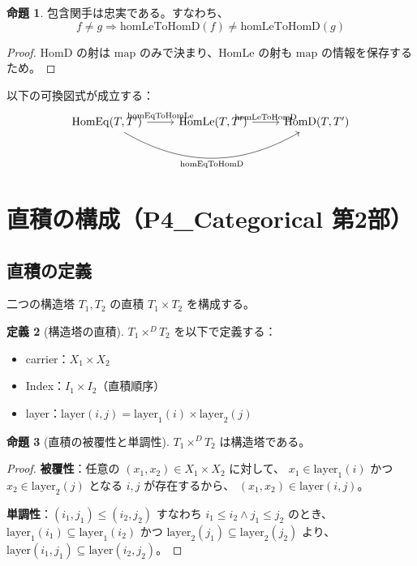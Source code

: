 \documentclass[a4paper,11pt]{ltjsarticle}
\theoremstyle{definition}
\newtheorem{definition}{定義}[section]
\newtheorem{proposition}[definition]{命題}
\begin{document}
\begin{proposition}
包含関手は忠実である。すなわち、
\[
f \neq g \Rightarrow \mathrm{homLeToHomD}(f) \neq \mathrm{homLeToHomD}(g)
\]
\end{proposition}

\begin{proof}
$\mathrm{HomD}$ の射は $\mathrm{map}$ のみで決まり、$\mathrm{HomLe}$ の射も $\mathrm{map}$ の情報を保存するため。
\end{proof}

以下の可換図式が成立する：
\[
\begin{tikzcd}
\mathrm{HomEq}(T, T') \arrow[r, "\mathrm{homEqToHomLe}"] \arrow[rr, bend right, "\mathrm{homEqToHomD}"']
  & \mathrm{HomLe}(T, T') \arrow[r, "\mathrm{homLeToHomD}"]
  & \mathrm{HomD}(T, T')
\end{tikzcd}
\]

\section{直積の構成（P4\_Categorical 第2部）}

\subsection{直積の定義}

二つの構造塔 $T_1, T_2$ の直積 $T_1 \times T_2$ を構成する。

\begin{definition}[構造塔の直積]
$T_1 \times^D T_2$ を以下で定義する：
\begin{itemize}
  \item carrier：$X_1 \times X_2$
  \item Index：$I_1 \times I_2$（直積順序）
  \item layer：$\mathrm{layer}(i, j) = \mathrm{layer}_1(i) \times \mathrm{layer}_2(j)$
\end{itemize}
\end{definition}

\begin{proposition}[直積の被覆性と単調性]
$T_1 \times^D T_2$ は構造塔である。
\end{proposition}

\begin{proof}
\textbf{被覆性}：任意の $(x_1, x_2) \in X_1 \times X_2$ に対して、
$x_1 \in \mathrm{layer}_1(i)$ かつ $x_2 \in \mathrm{layer}_2(j)$ となる $i, j$ が存在するから、
$(x_1, x_2) \in \mathrm{layer}(i, j)$。

\textbf{単調性}：$(i_1, j_1) \leq (i_2, j_2)$ すなわち $i_1 \leq i_2 \land j_1 \leq j_2$ のとき、
$\mathrm{layer}_1(i_1) \subseteq \mathrm{layer}_1(i_2)$ かつ $\mathrm{layer}_2(j_1) \subseteq \mathrm{layer}_2(j_2)$
より、$\mathrm{layer}(i_1, j_1) \subseteq \mathrm{layer}(i_2, j_2)$。
\end{proof}
\end{document}
